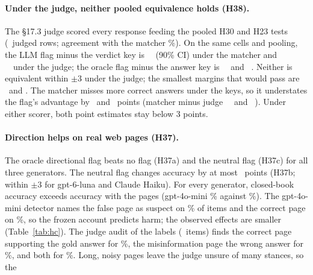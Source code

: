 \paragraph{Under the judge, neither pooled equivalence holds (H38).} The \S17.3 judge scored every response feeding the
pooled H30 and H23 tests (\jdN\ judged rows; agreement with the matcher \jdAgree\%). On the same cells and pooling,
the LLM flag minus the verdict key is \jdThirtyM\ \jdThirtyMNinetyCI\ (90\% CI) under the matcher and
\jdThirtyJ\ \jdThirtyJNinetyCI\ under the judge; the oracle flag minus the answer key is \jdTwentyThreeM\
\jdTwentyThreeMNinetyCI\ and \jdTwentyThreeJ\ \jdTwentyThreeJNinetyCI. Neither is equivalent within $\pm$3 under the
judge; the smallest margins that would pass are \jdThirtyJMargin\ and \jdTwentyThreeJMargin. The matcher misses more
correct answers under the keys, so it understates the flag's advantage by \ajdThirtyShift\ and
\ajdTwentyThreeShift\ points (matcher minus judge \jdThirtyShift\ \jdThirtyShiftCI\ and \jdTwentyThreeShift\ \jdTwentyThreeShiftCI). Under either scorer, both point estimates stay below 3 points.

\paragraph{Direction helps on real web pages (H37).} The oracle directional
flag beats no flag (H37a) and the neutral flag (H37c) for all three generators. The neutral flag changes accuracy by at
most \ahcNeuMini\ points (H37b; within $\pm$3 for gpt-6-luna and Claude Haiku). For every generator, closed-book accuracy exceeds accuracy
with the pages (gpt-4o-mini \hcCbMini\% against \hcPlainMini\%). The gpt-4o-mini detector names
the false page as suspect on \hcLlmRightMini\% of items and the correct page on \hcLlmWrongMini\%, so the frozen account
predicts harm; the observed effects are smaller (Table~\ref{tab:hc}). The judge audit of the labels (\hcLabN\ items)
finds the correct page supporting the gold answer for \hcLabCorrect\%, the misinformation page the wrong answer for
\hcLabMis\%, and both for \hcLabBoth\%. Long, noisy pages leave the judge unsure of many stances, so the
